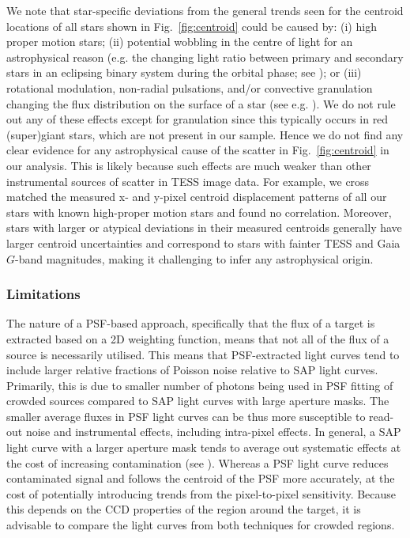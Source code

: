 \documentclass[fleqn,usenatbib]{mnras}
\begin{document}
We note that star-specific deviations from the general trends seen for the centroid locations of all stars shown in Fig.~\ref{fig:centroid} could be caused by: (i) high proper motion stars; (ii) potential wobbling in the centre of light for an astrophysical reason (e.g. the changing light ratio between primary and secondary stars in an eclipsing binary system during the orbital phase; see \citealt{SouthworthBowman2025}); or (iii) rotational modulation, non-radial pulsations, and/or convective granulation changing the flux distribution on the surface of a star (see e.g. \citealt{Chiavassa_2011}). We do not rule out any of these effects except for granulation since this typically occurs in red (super)giant stars, which are not present in our sample. Hence we do not find any clear evidence for any astrophysical cause of the scatter in Fig.~\ref{fig:centroid} in our analysis. This is likely because such effects are much weaker than other instrumental sources of scatter in TESS image data. For example, we cross matched the measured x- and y-pixel centroid displacement patterns of all our stars with known high-proper motion stars and found no correlation. Moreover, stars with larger or atypical deviations in their measured centroids generally have larger centroid uncertainties and correspond to stars with fainter TESS and {\sc Gaia} $G$-band magnitudes, making it challenging to infer any astrophysical origin.




\subsubsection{Limitations}\label{sec: limitations}

The nature of a PSF-based approach, specifically that the flux of a target is extracted based on a 2D weighting function, means that not all of the flux of a source is necessarily utilised. This means that PSF-extracted light curves tend to include larger relative fractions of Poisson noise relative to SAP light curves. Primarily, this is due to smaller number of photons being used in PSF fitting of crowded sources compared to SAP light curves with large aperture masks. The smaller average fluxes in PSF light curves can be thus more susceptible to read-out noise and instrumental effects, including intra-pixel effects. In general, a SAP light curve with a larger aperture mask tends to average out systematic effects at the cost of increasing contamination (see \citealt{Papics2017a, BowmanMichielsen2021}). Whereas a PSF light curve reduces contaminated signal and follows the centroid of the PSF more accurately, at the cost of potentially introducing trends from the pixel-to-pixel sensitivity. Because this depends on the CCD properties of the region around the target, it is advisable to compare the light curves from both techniques for crowded regions.
\end{document}
